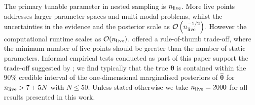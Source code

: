 \documentclass[fleqn,usenatbib,useAMS]{mnras}
\begin{document}
The primary tunable parameter in nested sampling is $n_{\rm live}$. More live points addresses larger parameter spaces and multi-modal problems, whilst the uncertainties in the evidence and the posterior scale as $\mathcal{O}\left(n_{\rm live}^{-1/2}\right)$. However the computational runtime scales as $\mathcal{O}(n_{\rm live})$. \cite{Ashton2022} offered a rule-of-thumb trade-off, where the minimum number of live points should be greater than the number of static parameters. Informal empirical tests conducted as part of this paper support the trade-off suggested by \cite{Ashton2022}; we find typically that the true ${\boldsymbol{\theta}}$ is contained within the 90\% credible interval of the one-dimensional marginalised posteriors of ${\boldsymbol{\hat{\theta}}}$ for $n_{\rm live} > 7 + 5N$ with $N \leq 50$. Unless stated otherwise we take $n_{\rm live} = 2000$ for all results presented in this work. \newline 
\end{document}
